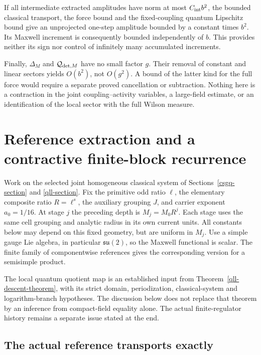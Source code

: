 \documentclass[11pt]{article}
\theoremstyle{remark}
\begin{document}
If all intermediate extracted amplitudes have norm at most
$C_{\rm int}b^2$, the bounded classical transport, the force
bound and the fixed-coupling quantum Lipschitz bound give
an unprojected one-step amplitude bounded by a constant
times $b^2$. Its Maxwell increment is consequently bounded
independently of $b$. This provides neither its sign nor
control of infinitely many accumulated increments.

Finally, $\Delta_M$ and $\mathcal Q_{{\rm det},M}$ have
no small factor $g$. Their removal of constant and linear
sectors yields $O(b^2)$, not $O(g^2)$. A bound of the latter
kind for the full force would require a separate proved
cancellation or subtraction. Nothing here is a contraction
in the joint coupling--activity variables, a large-field
estimate, or an identification of the local sector with the
full Wilson measure.


\section{Reference extraction and a contractive finite-block recurrence}
\label{eqr-section}

Work on the selected joint homogeneous classical system of
Sections~\ref{csgq-section} and \ref{qll-section}. Fix the primitive
odd ratio $\ell$, the elementary composite ratio $R=\ell^s$, the
auxiliary grouping $J$, and carrier exponent $a_0=1/16$.
At stage $j$ the preceding depth is $M_j=M_0R^j$. Each stage uses
the same cell grouping and analytic radius in its own current units.
All constants below may depend on this fixed geometry, but are uniform
in $M_j$. Use a simple gauge Lie algebra, in particular
$\mathfrak{su}(2)$, so the Maxwell functional is scalar. The finite
family of componentwise references gives the corresponding version
for a semisimple product.

The local quantum quotient map is an established input from
Theorem~\ref{qll-descent-theorem}, with its strict domain, periodization,
classical-system and logarithm-branch hypotheses. The discussion below
does not replace that theorem by an inference from compact-field
equality alone. The actual finite-regulator history remains a separate
issue stated at the end.

\subsection{The actual reference transports exactly}
\label{eqr-reference-section}
\end{document}

